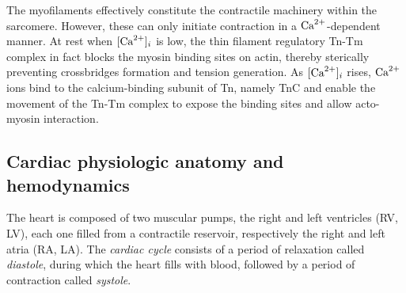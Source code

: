 \vspace{0.2cm}
The myofilaments effectively constitute the contractile machinery within the sarcomere. However, these can only initiate contraction in a $\textrm{Ca}^{2+}$-dependent manner. At rest when $[\textrm{Ca}^{2+}]_{i}$ is low, the thin filament regulatory Tn-Tm complex in fact blocks the myosin binding sites on actin, thereby sterically preventing crossbridges formation and tension generation. As $[\textrm{Ca}^{2+}]_{i}$ rises, $\textrm{Ca}^{2+}$ ions bind to the calcium-binding subunit of Tn, namely TnC and enable the movement of the Tn-Tm complex to expose the binding sites and allow acto-myosin interaction.





%
%
%
\subsection{Cardiac physiologic anatomy and hemodynamics}
The heart is composed of two muscular pumps, the right and left ventricles (\acs{RV}, \acs{LV}), each one filled from a contractile reservoir, respectively the right and left atria (\acs{RA}, \acs{LA}). The \textit{cardiac cycle} consists of a period of relaxation called \textit{diastole}, during which the heart fills with blood, followed by a period of contraction called \textit{systole}.

